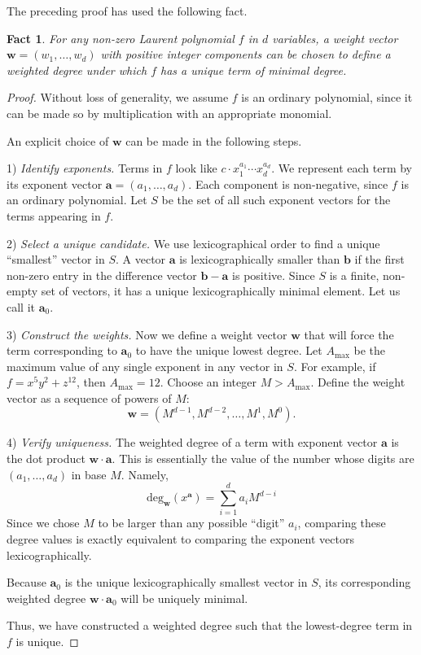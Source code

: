 \documentclass[aps,prb,english,superscriptaddress,twocolumn,tightenlines,showpacs,longbibliography,floatfix,amsfonts]{revtex4-2}
\newtheorem{fact}{Fact}
\begin{document}
The preceding proof has used the following fact.

\begin{fact} \label{fact1}
For any non-zero Laurent polynomial $f$ in $d$ variables, a weight vector $\mathbf{w}=(w_1, \dots, w_d)$ with positive integer components can be chosen to define a weighted degree under which $f$ has a unique term of minimal degree.
\end{fact}


\begin{proof}
Without loss of generality, we assume $f$ is an ordinary polynomial,
since it can be made so by multiplication with an appropriate monomial. 

An explicit choice of $\mathbf{w}$ can be made in the following steps.

1) \textit{Identify exponents.}
Terms in $f$ look like $c \cdot x_1^{a_1} \cdots x_d^{a_d}$. We represent each term by its exponent vector $\mathbf{a}=(a_1, \dots, a_d)$. Each component is non-negative, since $f$ is an ordinary polynomial. Let $S$ be the set of all such exponent vectors for the terms appearing in $f$.

2) \textit{Select a unique candidate.}
We use lexicographical order to find a unique ``smallest'' vector in $S$. A vector $\mathbf{a}$ is lexicographically smaller than $\mathbf{b}$ if the first non-zero entry in the difference vector $\mathbf{b}-\mathbf{a}$ is positive. Since $S$ is a finite, non-empty set of vectors, it has a unique lexicographically minimal element. Let us call it $\mathbf{a}_0$.

3) \textit{Construct the weights.}
Now we define a weight vector $\mathbf{w}$ that will force the term corresponding to $\mathbf{a}_0$ to have the unique lowest degree. Let $A_{\max}$ be the maximum value of any single exponent in any vector in $S$. For example, if $f=x^5 y^2 + z^{12}$, then $A_{\max}=12$. Choose an integer $M > A_{\max}$. Define the weight vector as a sequence of powers of $M$:
\begin{equation}
    \mathbf{w} = (M^{d-1}, M^{d-2}, \dots, M^1, M^0).
\end{equation}

4) \textit{Verify uniqueness.}
The weighted degree of a term with exponent vector $\mathbf{a}$ is the dot product $\mathbf{w} \cdot \mathbf{a}$. This is essentially the value of the number whose digits are $(a_1, \dots, a_d)$ in base $M$. Namely,
\begin{equation}
    \text{deg}_{\mathbf{w}}(x^\mathbf{a}) = \sum_{i=1}^d a_i M^{d-i}
\end{equation}
Since we chose $M$ to be larger than any possible ``digit'' $a_i$, comparing these degree values is exactly equivalent to comparing the exponent vectors lexicographically.

Because $\mathbf{a}_0$ is the unique lexicographically smallest vector in $S$, its corresponding weighted degree $\mathbf{w} \cdot \mathbf{a}_0$ will be uniquely minimal. 

Thus, we have constructed a weighted degree such that the lowest-degree term in $f$ is unique.
\end{proof}
\end{document}
